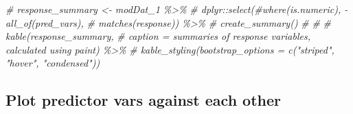 \documentclass[
]{article}
\newenvironment{Shaded}{\begin{snugshade}}{\end{snugshade}}
\newcommand{\CommentTok}[1]{\textcolor[rgb]{0.56,0.35,0.01}{\textit{#1}}}
\begin{document}
\begin{Shaded}
\begin{Highlighting}[]
\CommentTok{\# response\_summary \textless{}{-} modDat\_1 \%\textgreater{}\% }
\CommentTok{\#     dplyr::select(\#where(is.numeric), {-}all\_of(pred\_vars),}
\CommentTok{\#       matches(response)) \%\textgreater{}\% }
\CommentTok{\#     create\_summary()}
\CommentTok{\# }
\CommentTok{\# }
\CommentTok{\# kable(response\_summary, }
\CommentTok{\#       caption = \textquotesingle{}summaries of response variables, calculated using paint\textquotesingle{}) \%\textgreater{}\%}
\CommentTok{\# kable\_styling(bootstrap\_options = c("striped", "hover", "condensed")) }
\end{Highlighting}
\end{Shaded}

\subsection{Plot predictor vars against each
other}\label{plot-predictor-vars-against-each-other}
\end{document}
